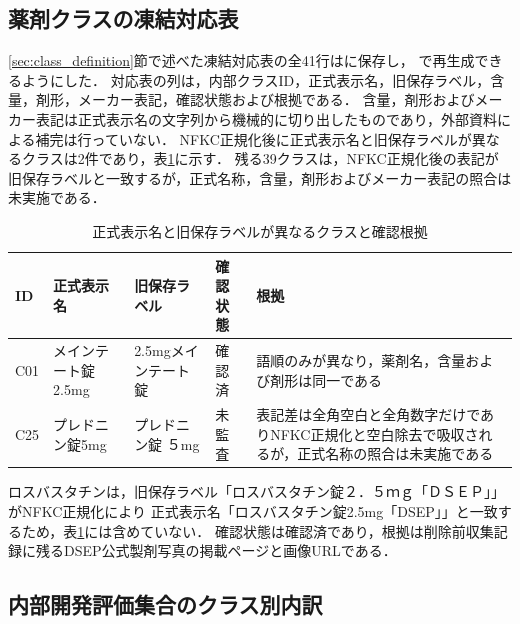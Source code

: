 \documentclass[uplatex,dvipdfmx]{jsarticle}
\begin{document}
\subsection{薬剤クラスの凍結対応表}\label{sec:appendix_labels}

\ref{sec:class_definition}節で述べた凍結対応表の全41行はに保存し，
で再生成できるようにした．
対応表の列は，内部クラスID，正式表示名，旧保存ラベル，含量，剤形，メーカー表記，確認状態および根拠である．
含量，剤形およびメーカー表記は正式表示名の文字列から機械的に切り出したものであり，外部資料による補完は行っていない．
NFKC正規化後に正式表示名と旧保存ラベルが異なるクラスは2件であり，表\ref{tab:label_freeze}に示す．
残る39クラスは，NFKC正規化後の表記が旧保存ラベルと一致するが，正式名称，含量，剤形およびメーカー表記の照合は未実施である．

\begin{table}[H]
  \centering
  \caption{正式表示名と旧保存ラベルが異なるクラスと確認根拠}
  \label{tab:label_freeze}
  \small
  \begin{tabular}{|l|l|l|l|p{4.0cm}|}
    \hline
    ID & 正式表示名 & 旧保存ラベル & 確認状態 & 根拠 \\ \hline
    C01 & メインテート錠2.5mg & 2.5mgメインテート錠 & 確認済 & 語順のみが異なり，薬剤名，含量および剤形は同一である \\ \hline
    C25 & プレドニン錠5mg & プレドニン錠 ５mg & 未監査 & 表記差は全角空白と全角数字だけでありNFKC正規化と空白除去で吸収されるが，正式名称の照合は未実施である \\ \hline
  \end{tabular}
\end{table}

ロスバスタチンは，旧保存ラベル「ロスバスタチン錠２．５ｍｇ「ＤＳＥＰ」」がNFKC正規化により
正式表示名「ロスバスタチン錠2.5mg「DSEP」」と一致するため，表\ref{tab:label_freeze}には含めていない．
確認状態は確認済であり，根拠は削除前収集記録に残るDSEP公式製剤写真の掲載ページと画像URLである．

\subsection{内部開発評価集合のクラス別内訳}
\end{document}
